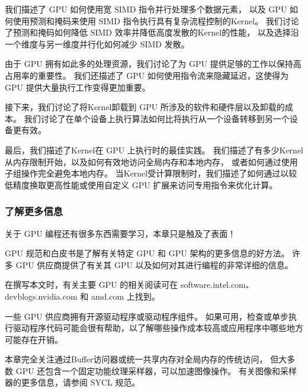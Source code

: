 我们描述了 GPU 如何使用宽 SIMD 指令并行处理多个数据元素，
以及 GPU 如何使用预测和掩码来使用 SIMD 指令执行具有复杂流程控制的Kernel。 
我们讨论了预测和掩码如何降低 SIMD 效率并降低高度发散的Kernel的性能，
以及选择沿一个维度与另一维度并行化如何减少 SIMD 发散。

由于 GPU 拥有如此多的处理资源，我们讨论了为 GPU 提供足够的工作以保持高占用率的重要性。 
我们还描述了 GPU 如何使用指令流来隐藏延迟，这使得为 GPU 提供大量执行工作变得更加重要。

接下来，我们讨论了将Kernel卸载到 GPU 所涉及的软件和硬件层以及卸载的成本。 
我们讨论了在单个设备上执行算法如何比将执行从一个设备转移到另一个设备更有效。

最后，我们描述了Kernel在 GPU 上执行时的最佳实践。 
我们描述了有多少Kernel从内存限制开始，以及如何有效地访问全局内存和本地内存，
或者如何通过使用子组操作完全避免本地内存。 
当Kernel受计算限制时，我们描述了如何通过以较低精度换取更高性能或使用自定义 GPU 扩展来访问专用指令来优化计算。

\subsubsection{了解更多信息}
关于 GPU 编程还有很多东西需要学习，本章只是触及了表面！

GPU 规范和白皮书是了解有关特定 GPU 和 GPU 架构的更多信息的好方法。 
许多 GPU 供应商提供了有关其 GPU 以及如何对其进行编程的非常详细的信息。

在撰写本文时，有关主要 GPU 的相关阅读可在 software.intel.com、devblogs.nvidia.com 和 amd.com 上找到。

一些 GPU 供应商拥有开源驱动程序或驱动程序组件。 
如果可用，检查或单步执行驱动程序代码可能会很有帮助，以了解哪些操作成本较高或应用程序中哪些地方可能存在开销。

本章完全关注通过Buffer访问器或统一共享内存对全局内存的传统访问，
但大多数 GPU 还包含一个固定功能纹理采样器，可以加速图像操作。 有关图像和采样器的更多信息，请参阅 SYCL 规范。
